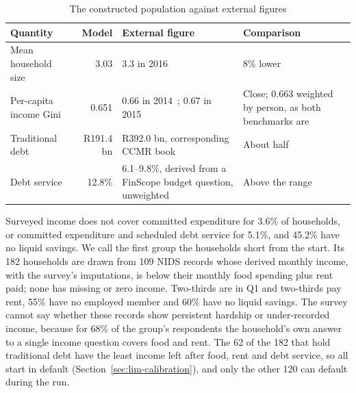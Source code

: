 \begin{table}[!htb]
\centering
\caption{The constructed population against external figures}
\label{tab:pop-external}
\begingroup\setlength{\tabcolsep}{5pt}\small
\begin{tabular}{H{3.1cm}rL{4.9cm}L{3.3cm}}
\toprule
\textbf{Quantity} & \textbf{Model} & \textbf{External figure} & \textbf{Comparison} \\
\midrule
Mean household size & 3.03 & 3.3 in 2016~\citep{statssa_cs_2016} & 8\% lower \\
\addlinespace
Per-capita income Gini & 0.651 & 0.66 in 2014~\citep{hundenborn2018drivers}; 0.67 in 2015~\citep{statssa2019inequality} & Close; 0.663 weighted by person, as both benchmarks are \\
\addlinespace
Traditional debt & R191.4 bn & R392.0 bn, corresponding \ac{CCMR} book~\citep{ncr_ccmr_2017} & About half \\
\addlinespace
Debt service & 12.8\% & 6.1--9.8\%, derived from a \ac{FinScope} budget question, unweighted~\citep{finscope2019} & Above the range \\
\bottomrule
\end{tabular}
\endgroup
\end{table}

Surveyed income does not cover committed expenditure for 3.6\% of households, or committed expenditure and scheduled debt service for
5.1\%, and 45.2\% have no liquid savings. We call the first group the households short from the
start. Its 182 households are drawn from 109 \ac{NIDS} records whose derived monthly income, with the
survey's imputations, is below their monthly food spending plus rent paid; none has missing or
zero income. Two-thirds are in Q1 and two-thirds pay rent, 55\% have no employed member and 60\%
have no liquid savings. The survey cannot say whether these records show persistent hardship or
under-recorded income, because for 68\% of the group's respondents the household's own answer to
a single income question covers food and rent. The 62 of the 182 that hold traditional debt have the least income left after food, rent and debt
service, so all start in default (Section~\ref{sec:lim-calibration}), and only the other 120 can
default during the run.

